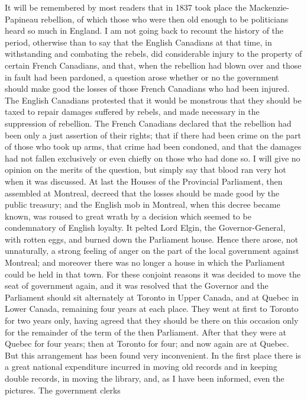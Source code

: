 It will be remembered by most readers that in 1837 took place the
Mackenzie-Papineau rebellion, of which those who were then old
enough to be politicians heard so much in England.  I am not going
back to recount the history of the period, otherwise than to say
that the English Canadians at that time, in withstanding and
combating the rebels, did considerable injury to the property of
certain French Canadians, and that, when the rebellion had blown
over and those in fault had been pardoned, a question arose whether
or no the government should make good the losses of those French
Canadians who had been injured.  The English Canadians protested
that it would be monstrous that they should be taxed to repair
damages suffered by rebels, and made necessary in the suppression
of rebellion.  The French Canadians declared that the rebellion had
been only a just assertion of their rights; that if there had been
crime on the part of those who took up arms, that crime had been
condoned, and that the damages had not fallen exclusively or even
chiefly on those who had done so.  I will give no opinion on the
merits of the question, but simply say that blood ran very hot when
it was discussed.  At last the Houses of the Provincial Parliament,
then assembled at Montreal, decreed that the losses should be made
good by the public treasury; and the English mob in Montreal, when
this decree became known, was roused to great wrath by a decision
which seemed to be condemnatory of English loyalty.  It pelted Lord
Elgin, the Governor-General, with rotten eggs, and burned down the
Parliament house.  Hence there arose, not unnaturally, a strong
feeling of anger on the part of the local government against
Montreal; and moreover there was no longer a house in which the
Parliament could be held in that town.  For these conjoint reasons
it was decided to move the seat of government again, and it was
resolved that the Governor and the Parliament should sit
alternately at Toronto in Upper Canada, and at Quebec in Lower
Canada, remaining four years at each place.  They went at first to
Toronto for two years only, having agreed that they should be there
on this occasion only for the remainder of the term of the then
Parliament.  After that they were at Quebec for four years; then at
Toronto for four; and now again are at Quebec.  But this
arrangement has been found very inconvenient.  In the first place
there is a great national expenditure incurred in moving old
records and in keeping double records, in moving the library, and,
as I have been informed, even the pictures.  The government clerks
